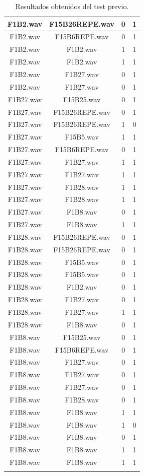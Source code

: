 \documentclass[11pt,a4paper]{book}
\begin{document}
\begin{longtable}[c]{|c|c|c|c|}
F1B2.wav&F15B26REPE.wav&0&1\\ \hline
F1B2.wav&F15B6REPE.wav&0&1\\ \hline
F1B2.wav&F1B2.wav&1&1\\ \hline
F1B2.wav&F1B2.wav&1&1\\ \hline
F1B2.wav&F1B27.wav&0&1\\ \hline
F1B2.wav&F1B27.wav&0&1\\ \hline
F1B27.wav&F15B25.wav&0&1\\ \hline
F1B27.wav&F15B26REPE.wav&0&1\\ \hline
F1B27.wav&F15B26REPE.wav&1&0\\ \hline
F1B27.wav&F15B5.wav&1&1\\ \hline
F1B27.wav&F15B6REPE.wav&0&1\\ \hline
F1B27.wav&F1B27.wav&1&1\\ \hline
F1B27.wav&F1B27.wav&1&1\\ \hline
F1B27.wav&F1B28.wav&1&1\\ \hline
F1B27.wav&F1B28.wav&1&1\\ \hline
F1B27.wav&F1B8.wav&0&1\\ \hline
F1B27.wav&F1B8.wav&1&1\\ \hline
F1B28.wav&F15B26REPE.wav&0&1\\ \hline
F1B28.wav&F15B26REPE.wav&0&1\\ \hline
F1B28.wav&F15B5.wav&0&1\\ \hline
F1B28.wav&F15B5.wav&0&1\\ \hline
F1B28.wav&F1B2.wav&0&1\\ \hline
F1B28.wav&F1B27.wav&0&1\\ \hline
F1B28.wav&F1B27.wav&1&1\\ \hline
F1B28.wav&F1B8.wav&0&1\\ \hline
F1B8.wav&F15B25.wav&0&1\\ \hline
F1B8.wav&F15B6REPE.wav&0&1\\ \hline
F1B8.wav&F1B27.wav&0&1\\ \hline
F1B8.wav&F1B27.wav&0&1\\ \hline
F1B8.wav&F1B27.wav&0&1\\ \hline
F1B8.wav&F1B28.wav&0&1\\ \hline
F1B8.wav&F1B8.wav&1&1\\ \hline
F1B8.wav&F1B8.wav&1&0\\ \hline
F1B8.wav&F1B8.wav&0&1\\ \hline
F1B8.wav&F1B8.wav&1&1\\ \hline
F1B8.wav&F1B8.wav&1&1\\ \hline
\caption{Resultados obtenidos del test previo.} 
\end{longtable}
\normalsize		
\end{document}
